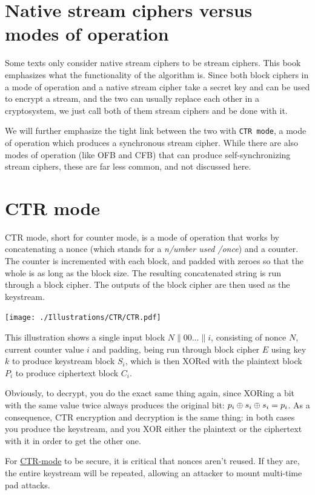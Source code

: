 \documentclass[11pt,ebook,table,dvipsnames]{memoir}
\begin{document}
\section{Native stream ciphers versus modes of operation}
\label{sec-2-3-13}

Some texts only consider native \glspl{stream cipher} to be stream
ciphers. This book emphasizes what the functionality of the algorithm
is. Since both block ciphers in a \gls{mode of operation} and a native
stream cipher take a secret key and can be used to encrypt a stream,
and the two can usually replace each other in a cryptosystem, we just
call both of them stream ciphers and be done with it.

We will further emphasize the tight link between the two with \texttt{CTR
mode}, a mode of operation which produces a synchronous stream
cipher. While there are also modes of operation (like OFB and CFB)
that can produce self-synchronizing stream ciphers, these are far
less common, and not discussed here.
\section{\label{CTR-mode}CTR mode}
\label{sec-2-3-14}

\gls{CTR mode}, short for counter mode, is a \gls{mode of operation}
that works by concatenating a \gls{nonce} (which stands for a \emph{n/umber
used /once}) and a counter. The counter is incremented with each
block, and padded with zeroes so that the whole is as long as the
block size. The resulting concatenated string is run through a block
cipher. The outputs of the block cipher are then used as the
keystream.

\texttt{[image: ./Illustrations/CTR/CTR.pdf]}

This illustration shows a single input block $N \| 00 \ldots \| i$,
consisting of nonce $N$, current counter value $i$ and padding, being
run through block cipher $E$ using key $k$ to produce keystream block
$S_i$, which is then XORed with the plaintext block $P_i$ to produce
ciphertext block $C_i$.

Obviously, to decrypt, you do the exact same thing again, since XORing
a bit with the same value twice always produces the original bit: $p_i
\oplus s_i \oplus s_i = p_i$. As a consequence, CTR encryption and
decryption is the same thing: in both cases you produce the keystream,
and you XOR either the plaintext or the ciphertext with it in order to
get the other one.

For \hyperref[CTR mode]{CTR-mode} to be secure, it is critical that \glspl{nonce} aren't
reused. If they are, the entire keystream will be repeated, allowing
an attacker to mount multi-time pad attacks.
\end{document}
